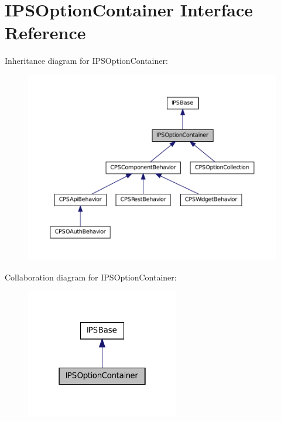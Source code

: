 \hypertarget{interfaceIPSOptionContainer}{
\section{IPSOptionContainer Interface Reference}
\label{interfaceIPSOptionContainer}
}


Inheritance diagram for IPSOptionContainer:\nopagebreak
\begin{figure}[H]
\begin{center}
\leavevmode
\includegraphics[width=400pt]{interfaceIPSOptionContainer__inherit__graph}
\end{center}
\end{figure}


Collaboration diagram for IPSOptionContainer:\nopagebreak
\begin{figure}[H]
\begin{center}
\leavevmode
\includegraphics[width=190pt]{interfaceIPSOptionContainer__coll__graph}
\end{center}
\end{figure}
